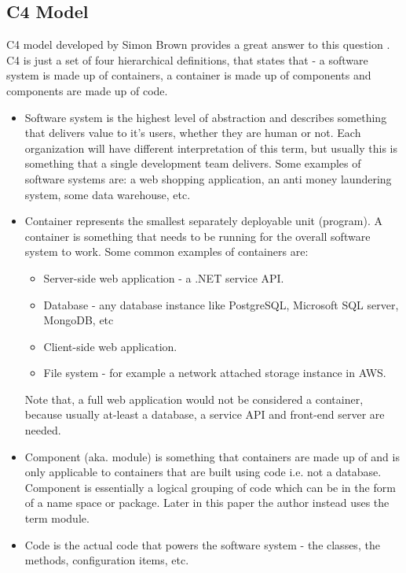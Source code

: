 \documentclass[12pt]{article}
\begin{document}
\subsection{C4 Model}
C4 model developed by Simon Brown provides a great answer to this question \cite{Bro11}. C4 is just a set of four hierarchical definitions, that states that - a software system is made up of containers, a container is made up of components and components are made up of code.
\begin{itemize}
    \item Software system is the highest level of abstraction and describes something that delivers value to it's users, whether they are human or not. Each organization will have different interpretation of this term, but usually this is something that a single development team delivers. Some examples of software systems are: a web shopping application, an anti money laundering system, some data warehouse, etc.
    \item Container represents the smallest separately deployable unit (program). A container is something that needs to be running for the overall software system to work. Some common examples of containers are:
    \begin{itemize}
        \item Server-side web application - a .NET service API.
        \item Database - any database instance like PostgreSQL, Microsoft SQL server, MongoDB, etc
        \item Client-side web application.
        \item File system - for example a network attached storage instance in AWS.
    \end{itemize}
    Note that, a full web application would not be considered a container, because usually at-least a database, a service API and front-end server are needed.
    \item Component (aka. module) is something that containers are made up of and is only applicable to containers that are built using code i.e. not a database. Component is essentially a logical grouping of code which can be in the form of a name space or package. Later in this paper the author instead uses the term module.
    \item Code is the actual code that powers the software system - the classes, the methods, configuration items, etc.
\end{itemize}
\newpage
\end{document}
